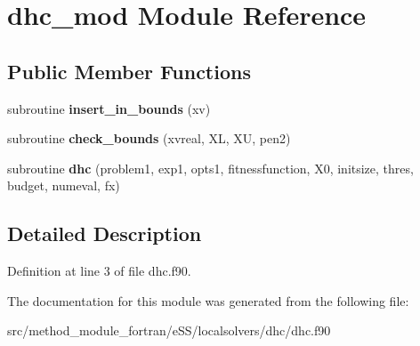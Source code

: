 \hypertarget{classdhc__mod}{\section{dhc\-\_\-mod Module Reference}
\label{classdhc__mod}
}
\subsection*{Public Member Functions}
\begin{DoxyCompactItemize}
\item 
\hypertarget{classdhc__mod_ac8e40ae00c1b8bf4894373e01965ebd2}{subroutine {\bfseries insert\-\_\-in\-\_\-bounds} (xv)}\label{classdhc__mod_ac8e40ae00c1b8bf4894373e01965ebd2}

\item 
\hypertarget{classdhc__mod_a0248a25439a69e1070e4f97785d685be}{subroutine {\bfseries check\-\_\-bounds} (xvreal, X\-L, X\-U, pen2)}\label{classdhc__mod_a0248a25439a69e1070e4f97785d685be}

\item 
\hypertarget{classdhc__mod_a5ad50de82fe11ab5312e475fee181457}{subroutine {\bfseries dhc} (problem1, exp1, opts1, fitnessfunction, X0, initsize, thres, budget, numeval, fx)}\label{classdhc__mod_a5ad50de82fe11ab5312e475fee181457}

\end{DoxyCompactItemize}


\subsection{Detailed Description}


Definition at line 3 of file dhc.\-f90.



The documentation for this module was generated from the following file\-:\begin{DoxyCompactItemize}
\item 
src/method\-\_\-module\-\_\-fortran/e\-S\-S/localsolvers/dhc/dhc.\-f90\end{DoxyCompactItemize}
